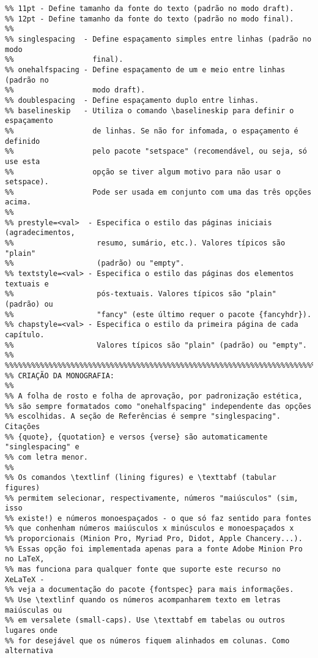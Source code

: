 \begin{verbatim}
%% 11pt - Define tamanho da fonte do texto (padrão no modo draft).
%% 12pt - Define tamanho da fonte do texto (padrão no modo final).
%%
%% singlespacing  - Define espaçamento simples entre linhas (padrão no modo
%%                  final).
%% onehalfspacing - Define espaçamento de um e meio entre linhas (padrão no
%%                  modo draft).
%% doublespacing  - Define espaçamento duplo entre linhas.
%% baselineskip   - Utiliza o comando \baselineskip para definir o espaçamento
%%                  de linhas. Se não for infomada, o espaçamento é definido 
%%                  pelo pacote "setspace" (recomendável, ou seja, só use esta
%%                  opção se tiver algum motivo para não usar o setspace).
%%                  Pode ser usada em conjunto com uma das três opções acima.
%%
%% prestyle=<val>  - Especifica o estilo das páginas iniciais (agradecimentos,
%%                   resumo, sumário, etc.). Valores típicos são "plain"
%%                   (padrão) ou "empty".
%% textstyle=<val> - Especifica o estilo das páginas dos elementos textuais e
%%                   pós-textuais. Valores típicos são "plain" (padrão) ou
%%                   "fancy" (este último requer o pacote {fancyhdr}).
%% chapstyle=<val> - Especifica o estilo da primeira página de cada capítulo.
%%                   Valores típicos são "plain" (padrão) ou "empty".
%%
%%%%%%%%%%%%%%%%%%%%%%%%%%%%%%%%%%%%%%%%%%%%%%%%%%%%%%%%%%%%%%%%%%%%%%%%%%%%%%%
%% CRIAÇÃO DA MONOGRAFIA:
%%
%% A folha de rosto e folha de aprovação, por padronização estética,
%% são sempre formatados como "onehalfspacing" independente das opções
%% escolhidas. A seção de Referências é sempre "singlespacing". Citações
%% {quote}, {quotation} e versos {verse} são automaticamente "singlespacing" e
%% com letra menor.
%%
%% Os comandos \textlinf (lining figures) e \texttabf (tabular figures)
%% permitem selecionar, respectivamente, números "maiúsculos" (sim, isso
%% existe!) e números monoespaçados - o que só faz sentido para fontes 
%% que conhenham números maiúsculos x minúsculos e monoespaçados x
%% proporcionais (Minion Pro, Myriad Pro, Didot, Apple Chancery...).
%% Essas opção foi implementada apenas para a fonte Adobe Minion Pro no LaTeX,
%% mas funciona para qualquer fonte que suporte este recurso no XeLaTeX -
%% veja a documentação do pacote {fontspec} para mais informações.
%% Use \textlinf quando os números acompanharem texto em letras maiúsculas ou
%% em versalete (small-caps). Use \texttabf em tabelas ou outros lugares onde
%% for desejável que os números fiquem alinhados em colunas. Como alternativa

\end{verbatim}
